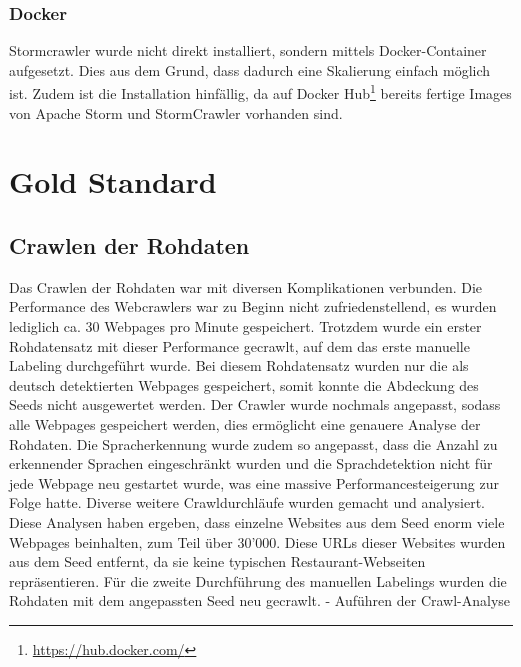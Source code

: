 \subsubsection{Docker}
Stormcrawler wurde nicht direkt installiert, sondern mittels Docker-Container aufgesetzt.
Dies aus dem Grund, dass dadurch eine Skalierung einfach möglich ist.
Zudem ist die Installation hinfällig, da auf Docker Hub\footnote{\url{https://hub.docker.com/}} bereits fertige Images von Apache Storm und StormCrawler vorhanden sind.
\section{Gold Standard}
\subsection{Crawlen der Rohdaten}
Das Crawlen der Rohdaten war mit diversen Komplikationen verbunden.
Die Performance des Webcrawlers war zu Beginn nicht zufriedenstellend, es wurden lediglich ca. 30 Webpages pro Minute gespeichert.
Trotzdem wurde ein erster Rohdatensatz mit dieser Performance gecrawlt, auf dem das erste manuelle Labeling durchgeführt wurde.
Bei diesem Rohdatensatz wurden nur die als deutsch detektierten Webpages gespeichert, somit konnte die Abdeckung des Seeds nicht ausgewertet werden.
Der Crawler wurde nochmals angepasst, sodass alle Webpages gespeichert werden, dies ermöglicht eine genauere Analyse der Rohdaten.
Die Spracherkennung wurde zudem so angepasst, dass die Anzahl zu erkennender Sprachen eingeschränkt wurden und die Sprachdetektion nicht für jede Webpage neu gestartet wurde, was eine massive Performancesteigerung zur Folge hatte.
Diverse weitere Crawldurchläufe wurden gemacht und analysiert.
Diese Analysen haben ergeben, dass einzelne Websites aus dem Seed enorm viele Webpages beinhalten, zum Teil über 30'000.
Diese URLs dieser Websites wurden aus dem Seed entfernt, da sie keine typischen Restaurant-Webseiten repräsentieren.
Für die zweite Durchführung des manuellen Labelings wurden die Rohdaten mit dem angepassten Seed neu gecrawlt.
- Auführen der Crawl-Analyse

